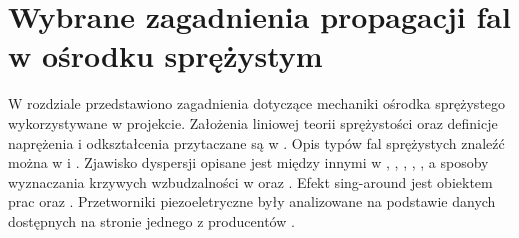 \chapter{Wybrane zagadnienia propagacji fal w ośrodku sprężystym}
\label{cha:wybrane_zagadnienia_propagacji_fal_w_osrodku_sprezystym}

W rozdziale przedstawiono zagadnienia dotyczące mechaniki ośrodka sprężystego wykorzystywane w projekcie. Założenia liniowej teorii sprężystości oraz definicje naprężenia i odkształcenia przytaczane są w \cite{bartek_wolny}. Opis typów fal sprężystych znaleźć można w \cite{bartek_rose} i \cite{bartek_nazarchuk}. Zjawisko dyspersji opisane jest między innymi w \cite{bartek_rose}, \cite{bartek_feruza}, \cite{bartek_cervena}, \cite{bartek_tian}, \cite{bartek_valsamos}, a sposoby wyznaczania krzywych wzbudzalności w \cite{bartek_kijanka} oraz \cite{bartek_fabien}. Efekt sing-around jest obiektem prac \cite{bartek_kwach} oraz \cite{bartek_kwach2}. Przetworniki piezoeletryczne były analizowane na podstawie danych dostępnych na stronie jednego z producentów \cite{bartek_piezo}.






























